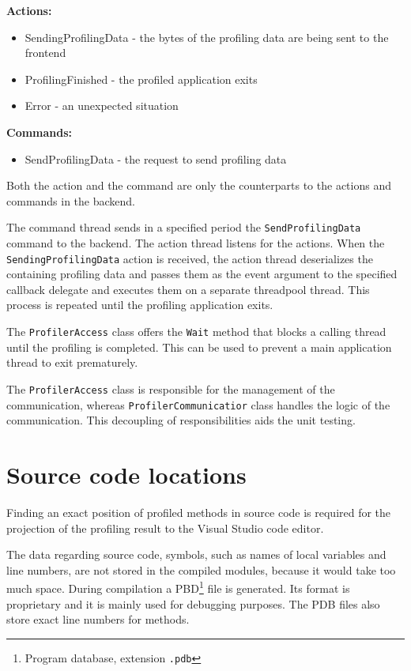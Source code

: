 \textbf{Actions:}
\begin{itemize}	
\item	SendingProfilingData - the bytes of the profiling data are being sent to the frontend
\item	ProfilingFinished - the profiled application exits
\item   Error - an unexpected situation
\end{itemize}

\textbf{Commands:}
\begin{itemize}	
\item	SendProfilingData - the request to send profiling data
\end{itemize}

Both the action and the command are only the counterparts to the actions and commands in the backend.

The command thread sends in a specified period the \texttt{SendProfilingData} command to the backend. The action thread listens for the actions. When the \texttt{SendingProfilingData} action is received, the action thread deserializes the containing profiling data and passes them as the event argument to the specified callback delegate and executes them on a separate threadpool thread. This process is repeated until the profiling application exits.

The \texttt{ProfilerAccess} class offers the \texttt{Wait} method that blocks a calling thread until the profiling is completed. This can be used to prevent a main application thread to exit prematurely.

The \texttt{ProfilerAccess} class is responsible for the management of the communication, whereas \texttt{ProfilerCommunicatior} class handles the logic of the communication. This decoupling of responsibilities aids the unit testing.

\section{Source code locations}
Finding an exact position of profiled methods in source code is required for the projection of the profiling result to the Visual Studio code editor. 

The data regarding source code, symbols, such as names of local variables and line numbers, are not stored in the compiled modules, because it would take too much space. During compilation a PBD\footnote{Program database, extension \texttt{.pdb}} file is generated. Its format is proprietary and it is mainly used for debugging purposes. The PDB files also store exact line numbers for methods.

